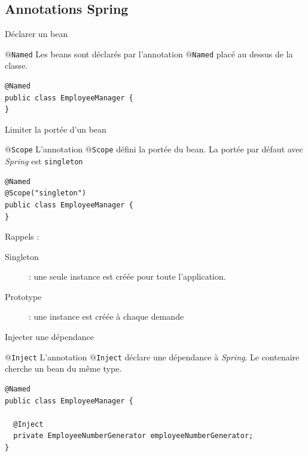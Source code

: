 \documentclass[compress]{beamer}%
\begin{document}
\subsection{Annotations Spring}
\begin{frame}[fragile]{Déclarer un bean}

	\begin{block}{\texttt{$@$Named}}
		Les beans sont déclarés par l'annotation \texttt{$@$Named} placé au dessus de la classe.
	\end{block}

	\pause
	\begin{lstlisting}
@Named
public class EmployeeManager {
}
	\end{lstlisting}

\end{frame}

\begin{frame}[fragile]{Limiter la portée d'un bean}

	\begin{block}{\texttt{$@$Scope}}
		L'annotation \texttt{$@$Scope} défini la portée du bean. La portée par défaut avec \emph{Spring} est \texttt{singleton}
	\end{block}

	\pause
	\begin{lstlisting}
@Named
@Scope("singleton")
public class EmployeeManager {
}
	\end{lstlisting}

	\pause
	Rappels :
	\begin{description}
		\item[Singleton] : une seule instance est créée pour toute l'application.
		\item[Prototype] : une instance est créée à chaque demande
	\end{description}


\end{frame}

\begin{frame}[fragile]{Injecter une dépendance}

	\begin{block}{\texttt{$@$Inject}}
		L'annotation \texttt{$@$Inject} déclare une dépendance à \emph{Spring}. Le contenaire cherche un bean du même type.
	\end{block}

	\pause
	\begin{lstlisting}
@Named
public class EmployeeManager {

  @Inject
  private EmployeeNumberGenerator employeeNumberGenerator;
}
	\end{lstlisting}
	
\end{frame}
\end{document}

